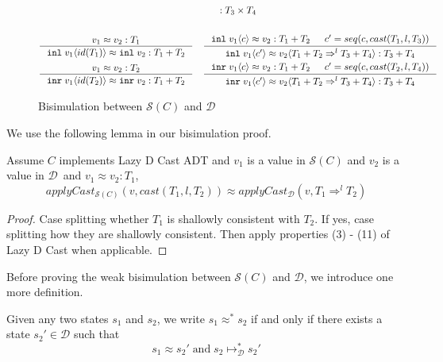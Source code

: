 \documentclass[acmsmall,review,anonymous]{acmart}\settopmatter{printfolios=true,printccs=false,printacmref=false}
\newcommand{\plus}[0]{+}
\newcommand{\POOprod}[2]{#1 \times #2}
\newcommand{\POOsum}[2]{#1 \plus #2}
\newcommand{\cOOcast}[3]{#1 \Rightarrow^{#2} #3}
\newcommand{\vOOcast}[2]{#1\langle#2\rangle}
\newcommand{\vOOinl}[1]{\mathtt{inl}\;#1}
\newcommand{\vOOinr}[1]{\mathtt{inr}\;#1}
\newcommand{\hcvOOinl}[2]{\mathtt{inl}\;#1\langle#2\rangle}
\newcommand{\hcvOOinr}[2]{\mathtt{inr}\;#1\langle#2\rangle}
\newcommand{\ineffCEKD}{$\mathcal{D}$}
\newcommand{\judgeDreduceTrans}[2]{#1 \longmapsto_{\mathcal{D}}^{*} #2}
\newcommand{\effCEK}[1]{$\mathcal{S}(#1)$}
\begin{document}
\begin{figure}
\begin{gather*}
{    : \POOprod{T_3}{T_4}
  }
\\ \\
  \inference{
    v_1 \approx v_2 : T_1
  }{
    \hcvOOinl{v_1}{id(T_1)} \approx \vOOinl{v_2}
    : \POOsum{T_1}{T_2}
  }
  \quad
  \inference{
    \hcvOOinl{v_1}{c} \approx v_2
    : \POOsum{T_1}{T_2} &
    c' = seq(c,cast(T_1,l,T_3))
  }{
    \hcvOOinl{v_1}{c'} \approx
    \vOOcast{v_2}{\cOOcast{\POOsum{T_1}{T_2}}{l}{\POOsum{T_3}{T_4}}}
    : \POOsum{T_3}{T_4} 
  }
  \\
  \inference{
  v_1 \approx v_2 : T_2
  }{
  \hcvOOinr{v_1}{id(T_2)} \approx \vOOinr{v_2}
  : \POOsum{T_1}{T_2}
  }
  \quad
  \inference{
  \hcvOOinr{v_1}{c} \approx v_2
  : \POOsum{T_1}{T_2} &
  c' = seq(c,cast(T_2,l,T_4))
  }{
  \hcvOOinr{v_1}{c'} \approx
  \vOOcast{v_2}{\cOOcast{\POOsum{T_1}{T_2}}{l}{\POOsum{T_3}{T_4}}}
  : \POOsum{T_3}{T_4}
  }
  \end{gather*}
  \caption{Bisimulation between \effCEK{C} and \ineffCEKD}
  \label{fig:bisim-SC-D}
\end{figure}


We use the following lemma in our bisimulation proof.

\begin{lemma}[SoAndSo]
  \label{thm:lem-apply-cast-SD}
  Assume $C$ implements Lazy D Cast ADT
  and $v_1$ is a value in \effCEK{C}
  and $v_2$ is a value in \ineffCEKD\
  and $v_1 \approx v_2 : T_1$,
  \[
  applyCast_{\text{\effCEK{C}}}(v,cast(T_1,l,T_2)) 
  \approx 
  applyCast_{\text{\ineffCEKD}}(v,\cOOcast{T_1}{l}{T_2})
  \]
\end{lemma}
\begin{proof}
  Case splitting whether $T_1$ is shallowly consistent with $T_2$.
  If yes, case splitting how they are shallowly consistent.
  Then apply properties (3) - (11) of Lazy D Cast when applicable.
\end{proof}

Before proving the weak bisimulation between \effCEK{C} and \ineffCEKD, we 
introduce one more definition.

\begin{definition}[$s \approx^{*} s$]
Given any two states $s_1$ and $s_2$, we write $s_1 \approx^{*} s_2$
if and only if there exists a state $s_2' \in \text{\ineffCEKD}$ such
that
\[
s_1 \approx s_2'
\;\text{and}\;
\judgeDreduceTrans{s_2}{s_2'}
\]
\end{definition}
\end{document}
